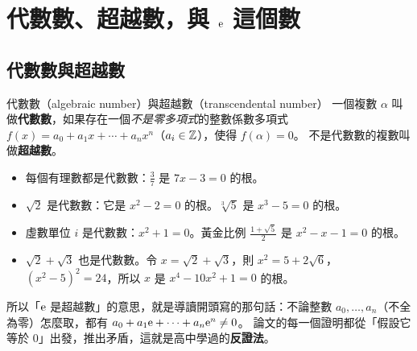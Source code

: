\section{代數數、超越數，與 $\mathrm{e}$ 這個數}\label{sec:numbers}

\subsection{代數數與超越數}

\begin{prereq}{代數數（algebraic number）與超越數（transcendental number）}
一個複數 $\alpha$ 叫做\textbf{代數數}，如果存在一個\emph{不是零多項式}的整數係數多項式
$f(x)=a_0+a_1x+\cdots+a_nx^n$（$a_i\in\mathbb{Z}$），使得 $f(\alpha)=0$。
不是代數數的複數叫做\textbf{超越數}。
\end{prereq}

\begin{exmp}
\begin{itemize}
  \item 每個有理數都是代數數：$\tfrac{3}{7}$ 是 $7x-3=0$ 的根。
  \item $\sqrt2$ 是代數數：它是 $x^2-2=0$ 的根。$\sqrt[3]{5}$ 是 $x^3-5=0$ 的根。
  \item 虛數單位 $i$ 是代數數：$x^2+1=0$。黃金比例 $\tfrac{1+\sqrt5}{2}$ 是 $x^2-x-1=0$ 的根。
  \item $\sqrt2+\sqrt3$ 也是代數數。令 $x=\sqrt2+\sqrt3$，則 $x^2=5+2\sqrt6$，
        $(x^2-5)^2=24$，所以 $x$ 是 $x^4-10x^2+1=0$ 的根。
\end{itemize}
\end{exmp}

所以「$\mathrm{e}$ 是超越數」的意思，就是導讀開頭寫的那句話：不論整數 $a_0,\ldots,a_n$（不全為零）怎麼取，都有 $a_0+a_1\mathrm{e}+\cdots+a_n\mathrm{e}^n\neq0$。
論文的每一個證明都從「假設它等於 $0$」出發，推出矛盾，這就是高中學過的\textbf{反證法}。

